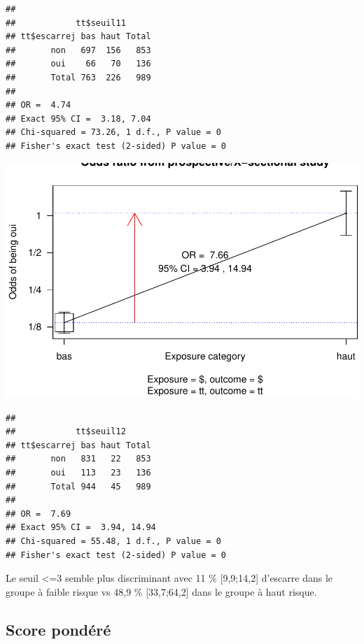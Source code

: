 \documentclass[]{article}
\begin{document}
\begin{verbatim}
## 
##            tt$seuil11
## tt$escarrej bas haut Total
##       non   697  156   853
##       oui    66   70   136
##       Total 763  226   989
## 
## OR =  4.74 
## Exact 95% CI =  3.18, 7.04  
## Chi-squared = 73.26, 1 d.f., P value = 0
## Fisher's exact test (2-sided) P value = 0
\end{verbatim}

\includegraphics{book_escarre_files/figure-latex/seuil1-2.pdf}

\begin{verbatim}
## 
##            tt$seuil12
## tt$escarrej bas haut Total
##       non   831   22   853
##       oui   113   23   136
##       Total 944   45   989
## 
## OR =  7.69 
## Exact 95% CI =  3.94, 14.94  
## Chi-squared = 55.48, 1 d.f., P value = 0
## Fisher's exact test (2-sided) P value = 0
\end{verbatim}

Le seuil \textless{}=3 semble plus discriminant avec 11 \%
{[}9,9;14,2{]} d'escarre dans le groupe à faible risque vs 48,9 \%
{[}33,7;64,2{]} dans le groupe à haut risque.

\hypertarget{score-pondere}{%
\subsection{Score pondéré}\label{score-pondere}}
\end{document}
